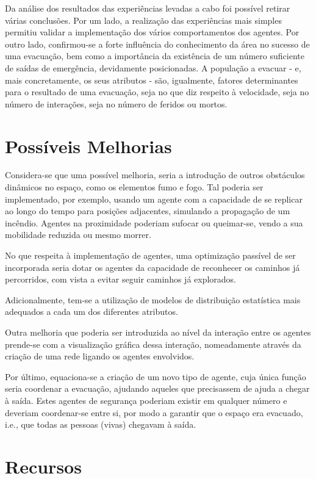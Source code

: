 \documentclass[12pt]{article}
\begin{document}
\begin{titlepage}
Da análise dos resultados das experiências levadas a cabo foi possível retirar várias conclusões. Por um lado, a realização das experiências mais simples permitiu validar a implementação dos vários comportamentos dos agentes.
Por outro lado, confirmou-se a forte influência do conhecimento da área no sucesso de uma evacuação, bem como a importância da existência de um número suficiente de saídas de emergência, devidamente posicionadas. A população a evacuar - e, mais concretamente, os seus atributos - são, igualmente, fatores determinantes para o resultado de uma evacuação, seja no que diz respeito à velocidade, seja no número de interações, seja no número de feridos ou mortos.

\section{Possíveis Melhorias}

Considera-se que uma possível melhoria, seria a introdução de outros obstáculos dinâmicos no espaço, como os elementos fumo e fogo. Tal poderia ser implementado, por exemplo, usando um agente com a capacidade de se replicar ao longo do tempo para posições adjacentes, simulando a propagação de um incêndio. Agentes na proximidade poderiam sufocar ou queimar-se, vendo a sua mobilidade reduzida ou mesmo morrer.

No que respeita à implementação de agentes, uma optimização passível de ser incorporada seria dotar os agentes da capacidade de reconhecer os caminhos já percorridos, com vista a evitar seguir caminhos já explorados. 

Adicionalmente, tem-se a utilização de modelos de distribuição estatística mais adequados a cada um dos diferentes atributos.

Outra melhoria que poderia ser introduzida ao nível da interação entre os agentes prende-se com a visualização gráfica dessa interação, nomeadamente através da criação de uma rede ligando os agentes envolvidos.

Por último, equaciona-se a criação de um novo tipo de agente, cuja única função seria coordenar a evacuação, ajudando aqueles que precisassem de ajuda a chegar à saída. Estes agentes de segurança poderiam existir em qualquer número e deveriam coordenar-se entre si, por modo a garantir que o espaço era evacuado, i.e., que todas as pessoas (vivas) chegavam à saída.



\section{Recursos}

\end{titlepage}
\end{document}

